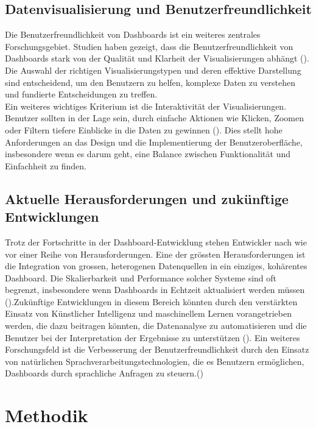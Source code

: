 \documentclass[a4paper, 12pt]{scrartcl}
\begin{document}
\subsection{Datenvisualisierung und Benutzerfreundlichkeit}
Die Benutzerfreundlichkeit von Dashboards ist ein weiteres zentrales Forschungsgebiet. Studien haben gezeigt, dass die Benutzerfreundlichkeit von Dashboards stark von der Qualität und Klarheit der Visualisierungen abhängt (\cite{HYNEK2015}). Die Auswahl der richtigen Visualisierungstypen und deren effektive Darstellung sind entscheidend, um den Benutzern zu helfen, komplexe Daten zu verstehen und fundierte Entscheidungen zu treffen.\\[1em]Ein weiteres wichtiges Kriterium ist die Interaktivität der Visualisierungen. Benutzer sollten in der Lage sein, durch einfache Aktionen wie Klicken, Zoomen oder Filtern tiefere Einblicke in die Daten zu gewinnen (\cite{Alhamadi2020}). Dies stellt hohe Anforderungen an das Design und die Implementierung der Benutzeroberfläche, insbesondere wenn es darum geht, eine Balance zwischen Funktionalität und Einfachheit zu finden.

\subsection{Aktuelle Herausforderungen und zukünftige Entwicklungen}
Trotz der Fortschritte in der Dashboard-Entwicklung stehen Entwickler nach wie vor einer Reihe von Herausforderungen. Eine der grössten Herausforderungen ist die Integration von grossen, heterogenen Datenquellen in ein einziges, kohärentes Dashboard. Die Skalierbarkeit und Performance solcher Systeme sind oft begrenzt, insbesondere wenn Dashboards in Echtzeit aktualisiert werden müssen (\cite{MartinezOrtiz2019}).\newpage Zukünftige Entwicklungen in diesem Bereich könnten durch den verstärkten Einsatz von Künstlicher Intelligenz und maschinellem Lernen vorangetrieben werden, die dazu beitragen könnten, die Datenanalyse zu automatisieren und die Benutzer bei der Interpretation der Ergebnisse zu unterstützen (\cite{Mukhopadhyay2019}). Ein weiteres Forschungsfeld ist die Verbesserung der Benutzerfreundlichkeit durch den Einsatz von natürlichen Sprachverarbeitungstechnologien, die es Benutzern ermöglichen, Dashboards durch sprachliche Anfragen zu steuern.(\cite{Kumar2021})
\newpage
	\section{Methodik}
	\label{sec:standDerForschung}
\end{document}
